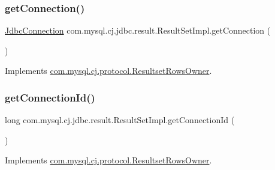 \mbox{\label{classcom_1_1mysql_1_1cj_1_1jdbc_1_1result_1_1_result_set_impl_a78cd466823b475c27688f946746c397b}} 
\subsubsection{\texorpdfstring{get\+Connection()}{getConnection()}}
{\footnotesize\ttfamily \mbox{\hyperlink{interfacecom_1_1mysql_1_1cj_1_1jdbc_1_1_jdbc_connection}{Jdbc\+Connection}} com.\+mysql.\+cj.\+jdbc.\+result.\+Result\+Set\+Impl.\+get\+Connection (\begin{DoxyParamCaption}{ }\end{DoxyParamCaption})}



Implements \mbox{\hyperlink{interfacecom_1_1mysql_1_1cj_1_1protocol_1_1_resultset_rows_owner_a8bc104d4800ae94bdb0988a9510e71ea}{com.\+mysql.\+cj.\+protocol.\+Resultset\+Rows\+Owner}}.

\mbox{\label{classcom_1_1mysql_1_1cj_1_1jdbc_1_1result_1_1_result_set_impl_a8ddd259badcea61d389af97efb5bf7db}} 
\subsubsection{\texorpdfstring{get\+Connection\+Id()}{getConnectionId()}}
{\footnotesize\ttfamily long com.\+mysql.\+cj.\+jdbc.\+result.\+Result\+Set\+Impl.\+get\+Connection\+Id (\begin{DoxyParamCaption}{ }\end{DoxyParamCaption})}



Implements \mbox{\hyperlink{interfacecom_1_1mysql_1_1cj_1_1protocol_1_1_resultset_rows_owner_abf4aad452e523576633b260da5c697c9}{com.\+mysql.\+cj.\+protocol.\+Resultset\+Rows\+Owner}}.


